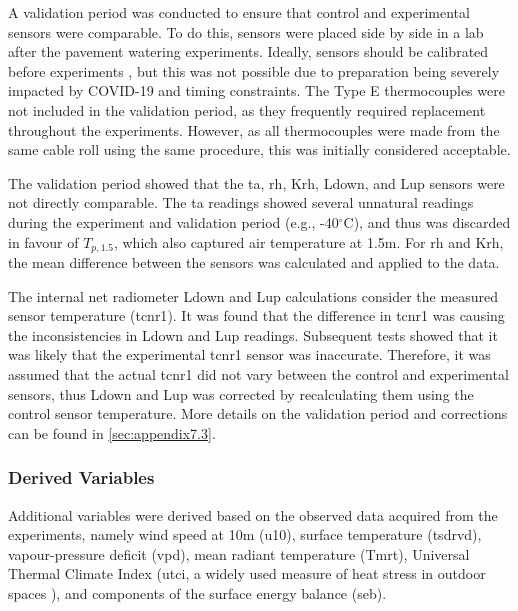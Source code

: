 \documentclass[final,3p,times,authoryear]{elsarticle}
\begin{document}
A validation period was conducted to ensure that control and experimental sensors were
comparable. To do this, sensors were placed side by side in a lab after the pavement
watering experiments. Ideally, sensors should be calibrated before experiments \citep{Phillips2001}, but this was not possible due to preparation being severely impacted by COVID-19 and timing constraints. The Type E thermocouples
were not included in the validation period, as they frequently required replacement
throughout the experiments. However, as all thermocouples were made from the same
cable roll using the same procedure, this was initially considered acceptable.

The validation period showed that the \gls{ta}, \gls{rh}, \gls{Krh}, \gls{Ldown}, and \gls{Lup} sensors were not directly comparable. The \gls{ta} readings showed several unnatural readings during the experiment and validation period (e.g., -40$^{\circ}$C), and thus was discarded in favour of $T_{p,1.5}$, which also captured air temperature at 1.5m. For \gls{rh} and \gls{Krh}, the mean difference between the sensors was calculated and applied to the data. 

The internal net radiometer \gls{Ldown} and \gls{Lup} calculations consider the measured sensor temperature (\gls{tcnr1}). It was found that the difference in \gls{tcnr1} was causing the inconsistencies in \gls{Ldown} and \gls{Lup} readings. Subsequent tests showed that it was likely that the experimental \gls{tcnr1} sensor was inaccurate. Therefore, it was assumed that the actual \gls{tcnr1} did not vary between the control and experimental sensors, thus \gls{Ldown} and \gls{Lup} was corrected by recalculating them using the control sensor temperature. More details on the validation period and corrections can be found in \ref{sec:appendix7.3}.

\subsubsection{Derived Variables}\label{sec:methods2.2.2}

Additional variables were derived based on the observed data acquired from the
experiments, namely wind speed at 10m (\gls{u10}), surface temperature (\gls{tsdrvd}), vapour-pressure deficit (\gls{vpd}), mean radiant temperature (\gls{Tmrt}), Universal Thermal Climate Index (\gls{utci}, a widely used measure of heat stress in outdoor spaces \citep{Zare2018a}), and components of the surface energy balance (\gls{seb}).
\end{document}
